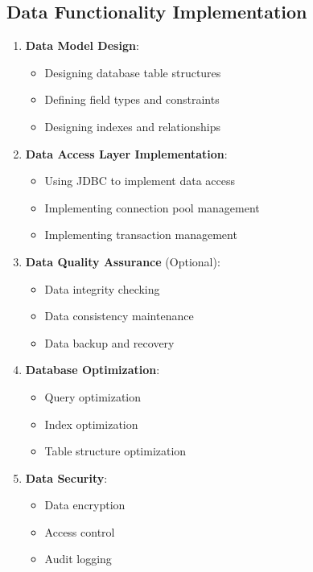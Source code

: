 \documentclass[a4paper,12pt]{article}
\begin{document}
\subsection{Data Functionality Implementation}

\begin{enumerate}
  \item \textbf{Data Model Design}:
    \begin{itemize}
      \item Designing database table structures
      \item Defining field types and constraints
      \item Designing indexes and relationships
    \end{itemize}
  
  \item \textbf{Data Access Layer Implementation}:
    \begin{itemize}
      \item Using JDBC to implement data access
      \item Implementing connection pool management
      \item Implementing transaction management
    \end{itemize}
  
  \item \textbf{Data Quality Assurance} (Optional):
    \begin{itemize}
      \item Data integrity checking
      \item Data consistency maintenance
      \item Data backup and recovery
    \end{itemize}
  
  \item \textbf{Database Optimization}:
    \begin{itemize}
      \item Query optimization
      \item Index optimization
      \item Table structure optimization
    \end{itemize}
  
  \item \textbf{Data Security}:
    \begin{itemize}
      \item Data encryption
      \item Access control
      \item Audit logging
    \end{itemize}
\end{enumerate}
\end{document}
